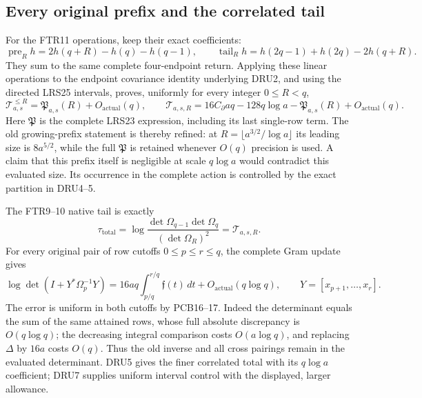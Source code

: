 \documentclass[11pt,a4paper]{article}
\begin{document}
\subsection{Every original prefix and the correlated tail}
For the FTR11 operations, keep their exact coefficients:
\[
 \operatorname{pre}_Rh=2h(q+R)-h(q)-h(q-1),\qquad
 \operatorname{tail}_Rh=h(2q-1)+h(2q)-2h(q+R).
 \tag{DRU4}
\]
They sum to the same complete four-endpoint return.  Applying these
linear operations to the endpoint covariance identity underlying DRU2,
and using the directed LRS25 intervals,
proves, uniformly for every integer $0\le R<q$,
\[
 \mathcal T_{a,s}^{\le R}=\mathfrak P_{a,s}(R)+O_{\mathrm{actual}}(q),
 \qquad
 \mathscr T_{a,s,R}=16C_\partial aq-128q\log a
                   -\mathfrak P_{a,s}(R)+O_{\mathrm{actual}}(q).
 \tag{DRU5}
\]
Here $\mathfrak P$ is the complete LRS23 expression, including its
last single-row term.  The old growing-prefix statement is thereby
refined: at $R=\lfloor a^{3/2}/\log a\rfloor$ its leading size is
$8a^{5/2}$, while the full $\mathfrak P$ is retained whenever
$O(q)$ precision is used.  A claim that this prefix itself is
negligible at scale $q\log a$ would contradict this evaluated size.
Its occurrence in the complete action is controlled by the exact
partition in DRU4--5.

The FTR9--10 native tail is exactly
\[
 \tau_{\mathrm{total}}
 =\log\frac{\det\Omega_{q-1}\det\Omega_q}{(\det\Omega_R)^2}
 =\mathscr T_{a,s,R}.
 \tag{DRU6}
\]
For every original pair of row cutoffs $0\le p\le r\le q$, the
complete Gram update gives
\[
 \log\det(I+Y^*\Omega_p^{-1}Y)
 =16aq\int_{p/q}^{r/q}\mathfrak f(t)\,dt
       +O_{\mathrm{actual}}(q\log q),\qquad
 Y=[x_{p+1},\ldots,x_r].
 \tag{DRU7}
\]
The error is uniform in both cutoffs by PCB16--17.  Indeed the
determinant equals the sum of the same attained rows, whose full
absolute discrepancy is $O(q\log q)$; the decreasing integral
comparison costs $O(a\log q)$, and replacing $\Delta$ by $16a$
costs $O(q)$.  Thus the old inverse and all cross pairings remain
in the evaluated determinant.  DRU5 gives the finer correlated
total with its $q\log a$ coefficient; DRU7 supplies uniform interval
control with the displayed, larger allowance.
\end{document}
